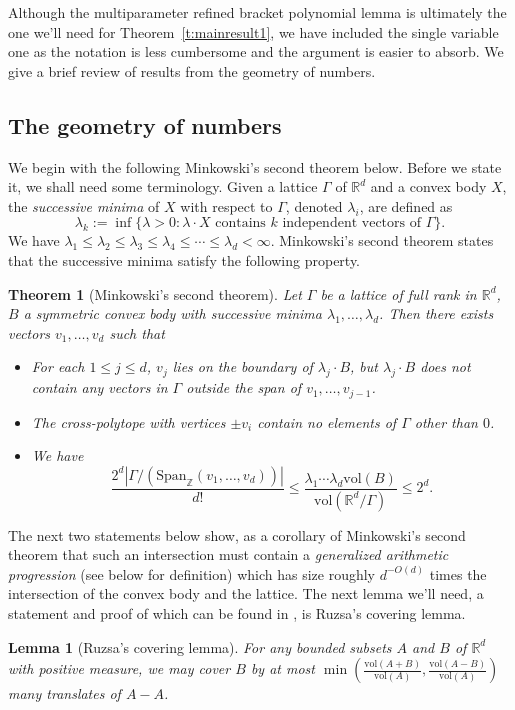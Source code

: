 \documentclass[11pt, a4paper]{amsart}
\theoremstyle{plain}
\theoremstyle{plain}
\newtheorem{theorem}{Theorem}
\newtheorem{lemma}{Lemma}
\theoremstyle{definition}
\theoremstyle{remark}
\numberwithin{equation}{section}
\numberwithin{lemma}{section}
\numberwithin{proposition}{section}
\numberwithin{corollary}{section}
\numberwithin{definition}{section}
\numberwithin{claim}{section}
\begin{document}
Although the multiparameter refined bracket polynomial lemma is ultimately the one we'll need for Theorem~\ref{t:mainresult1}, we have included the single variable one as the notation is less cumbersome and the argument is easier to absorb. We give a brief review of results from the geometry of numbers.
\subsection{The geometry of numbers}
We begin with the following Minkowski's second theorem below. Before we state it, we shall need some terminology. Given a lattice $\Gamma$ of $\mathbb{R}^d$ and a convex body $X$, the \emph{successive minima} of $X$ with respect to $\Gamma$, denoted $\lambda_i$, are defined as
$$\lambda_k := \inf\{\lambda > 0: \lambda \cdot X \text{ contains } k \text{ independent vectors of } \Gamma\}.$$
We have $\lambda_1 \le \lambda_2 \le \lambda_3 \le \lambda_4 \le \cdots \le \lambda_d < \infty.$
Minkowski's second theorem \cite[Theorem 3.30]{TV10} states that the successive minima satisfy the following property.
\begin{theorem}[Minkowski's second theorem]
Let $\Gamma$ be a lattice of full rank in $\mathbb{R}^d$, $B$ a symmetric convex body with successive minima $\lambda_1, \dots, \lambda_d$. Then there exists vectors $v_1, \dots, v_d$ such that
\begin{itemize}
    \item For each $1 \le j \le d$, $v_j$ lies on the boundary of $\lambda_j \cdot B$, but $\lambda_j \cdot B$ does not contain any vectors in $\Gamma$ outside the span of $v_1, \dots, v_{j - 1}$. 
    \item The cross-polytope with vertices $\pm v_i$ contain no elements of $\Gamma$ other than $0$.
    \item We have
    $$\frac{2^d |\Gamma/(\mathrm{Span}_{\mathbb{Z}}(v_1, \dots, v_d))|}{d!} \le \frac{\lambda_1 \cdots \lambda_d\mathrm{vol}(B)}{\mathrm{vol}(\mathbb{R}^d/\Gamma)} \le 2^d.$$
\end{itemize}
\end{theorem}
The next two statements below show, as a corollary of Minkowski's second theorem that such an intersection must contain a \emph{generalized arithmetic progression} (see below for definition) which has size roughly $d^{-O(d)}$ times the intersection of the convex body and the lattice. The next lemma we'll need, a statement and proof of which can be found in \cite[Lemma 3.14]{TV10}, is Ruzsa's covering lemma.
\begin{lemma}[Ruzsa's covering lemma]\label{l:Ruzsa}
For any bounded subsets $A$ and $B$ of $\mathbb{R}^d$ with positive measure, we may cover $B$ by at most $\min\left(\frac{\mathrm{vol}(A + B)}{\mathrm{vol}(A)}, \frac{\mathrm{vol}(A - B)}{\mathrm{vol}(A)}\right)$ many translates of $A - A$. 
\end{lemma}
\end{document}
